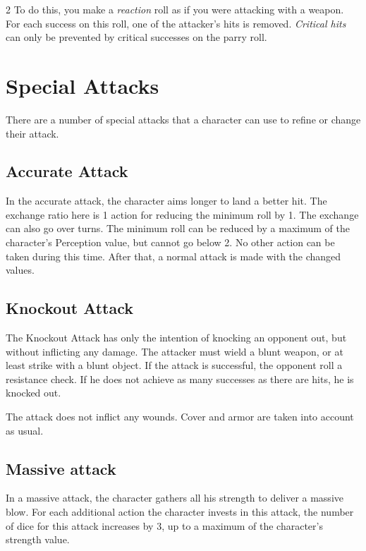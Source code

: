 \begin{multicols}{2}
To do this, you make a \textit{reaction} roll as if you were attacking with a weapon. For each success on this roll, one of the attacker's hits is removed. \textit{Critical hits} can only be prevented by critical successes on the parry roll.

\section{Special Attacks}

There are a number of special attacks that a character can use to refine or change their attack.

\subsection{Accurate Attack}

In the accurate attack, the character aims longer to land a better hit. The exchange ratio here is 1 action for reducing the minimum roll by 1. The exchange can also go over turns. The minimum roll can be reduced by a maximum of the character's Perception value, but cannot go below 2. No other action can be taken during this time. After that, a normal attack is made with the changed values.

\subsection{Knockout Attack}

The Knockout Attack has only the intention of knocking an opponent out, but without inflicting any damage. The attacker must wield a blunt weapon, or at least strike with a blunt object. If the attack is successful, the opponent roll a resistance check. If he does not achieve as many successes as there are hits, he is knocked out.

The attack does not inflict any wounds. Cover and armor are taken into account as usual.

\subsection{Massive attack}

In a massive attack, the character gathers all his strength to deliver a massive blow. For each additional action the character invests in this attack, the number of dice for this attack increases by 3, up to a maximum of the character's strength value.


\end{multicols}
